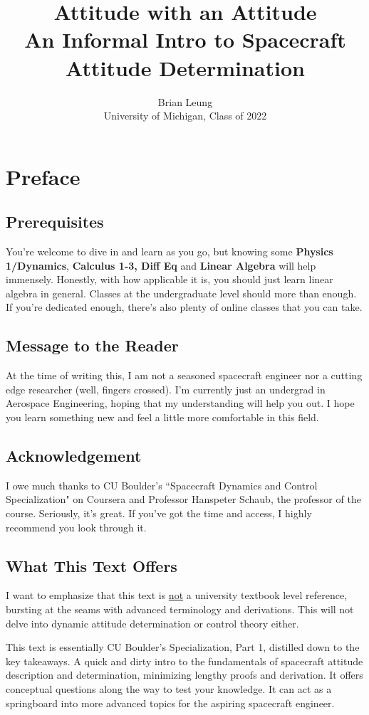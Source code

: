\documentclass[a4paper,14pt]{extreport}
\title{Attitude with an Attitude \\
\large An Informal Intro to Spacecraft Attitude Determination}
\author{Brian Leung\\University of Michigan, Class of 2022}
\begin{document}
\maketitle
\setcounter{tocdepth}{0}
\tableofcontents{}
\chapter{Preface}
\section{Prerequisites}
You're welcome to dive in and learn as you go, but knowing some \textbf{Physics 1/Dynamics}, \textbf{Calculus 1-3, Diff Eq} and \textbf{Linear Algebra} will help immensely. Honestly, with how applicable it is, you should just learn linear algebra in general. Classes at the undergraduate level should more than enough. If you're dedicated enough, there's also plenty of online classes that you can take.

\section{Message to the Reader}
At the time of writing this, I am not a seasoned spacecraft engineer nor a cutting edge researcher (well, fingers crossed). I'm currently just an undergrad in Aerospace Engineering, hoping that my understanding  will help you out. I hope you learn something new and feel a little more comfortable in this field.

\section{Acknowledgement}
I owe much thanks to CU Boulder's ``Spacecraft Dynamics and Control Specialization" on Coursera and Professor Hanspeter Schaub, the professor of the course. Seriously, it's great. If you've got the time and access, I highly recommend you look through it.

\section{What This Text Offers}
I want to emphasize that this text is \underline{not} a university textbook level reference, bursting at the seams with advanced terminology and derivations. This will not delve into dynamic attitude determination or control theory either. 

This text is essentially CU Boulder's Specialization, Part 1, distilled down to the key takeaways. A quick and dirty intro to the fundamentals of spacecraft attitude description and determination, minimizing lengthy proofs and derivation. It offers conceptual questions along the way to test your knowledge. It can act as a springboard into more advanced topics for the aspiring spacecraft engineer.
\end{document}
